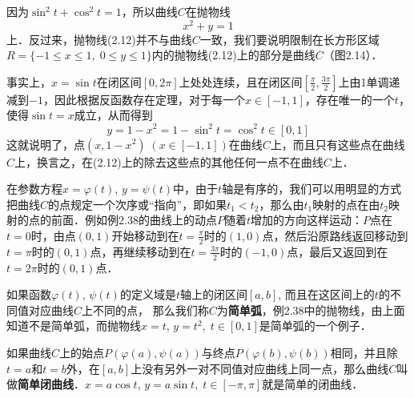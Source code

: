 \begin{solution}
因为$\sin^2 t+\cos^2 t=1 $，所以曲线$C$在抛物线
\begin{equation}
    x^2+y=1
\end{equation}
上．反过来，抛物线(2.12)并不与曲线$C$一致，我们要说明限制在长方形区域$R=\{-1\le x\le 1,\; 0\le y\le 1\}$内的抛物线(2.12)上的部分是曲线$C$（图2.14）．

\begin{figure}[htp]
    \centering
{}
    \caption{}
\end{figure}

事实上，$x=\sin t$在闭区间$[0,2\pi]$上处处连续，且在闭区间$\left[\frac{\pi}{2},\frac{3\pi}{2}\right]$上由1单调递减到$-1$，因此根据反函数存在定理，对于每一个$x\in[-1,1]$，存在唯一的一个$t$，使得$\sin t=x$成立，从而得到
\[y=1-x^2=1-\sin^2 t=\cos^2 t\in [0,1]\]
这就说明了，点$(x,1-x^2)\; (x\in [-1, 1])$在曲线$C$上，而且只有这些点在曲线$C$上，换言之，在(2.12)上的除去这些点的其他任何一点不在曲线$C$上．
\end{solution}

在参数方程$x=\varphi(t)$, $y=\psi(t)$中，由于$t$轴是有序的，我们可以用明显的方式把曲线$C$的点规定一个次序或“指向”，即如果$t_1<t_2$，那么由$t_1$映射的点在由$t_2$映射的点的前面．例如例2.38的曲线上的动点$P$随着$t$增加的方向这样运动：$P$点在$t=0$时，由点$(0,1)$开始移动到在$t=\frac{\pi}{2}$时的$(1,0)$点，然后沿原路线返回移动到$t=\pi$时的$(0,1)$点，再继续移动到在$t=\frac{3\pi}{2}$时的$(-1, 0)$点，最后又返回到在$t=2\pi$时的$(0, 1)$点．

如果函数$\varphi(t)$, $\psi(t)$的定义域是$t$轴上的闭区间$[a,b]$, 而且在这区间上的$t$的不同值对应曲线$C$上不同的点，
那么我们称$C$为\textbf{简单弧}，例2.38中的抛物线，由上面知道不是简单弧，而抛物线$x=t$, $y=t^2,\; t\in [0, 1]$是简单弧的一个例子．

如果曲线$C$上的始点$P(\varphi(a),\psi(a))$与终点$P(\varphi(b),\psi(b))$相同，并且除$t=a$和$t=b$外，在$[a,b]$上没有另外一对不同值对应曲线上同一点，那么曲线$C$叫做\textbf{简单闭曲线}．$x=a\cos t$, $y=a\sin t,\; t\in [-\pi,\pi]$就是简单的闭曲线．

